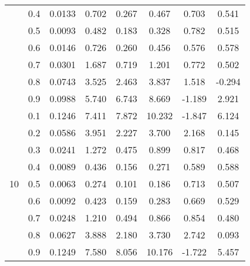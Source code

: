 \documentclass[11pt,a4paper]{report}
\begin{document}
\begin{longtable}{ | c | c || c | c | c | c | c | c | }
 & 0.4 & 0.0133 & 0.702 & 0.267 & 0.467 & 0.703 & 0.541 \\
 & 0.5 & 0.0093 & 0.482 & 0.183 & 0.328 & 0.782 & 0.515 \\
 & 0.6 & 0.0146 & 0.726 & 0.260 & 0.456 & 0.576 & 0.578 \\
 & 0.7 & 0.0301 & 1.687 & 0.719 & 1.201 & 0.772 & 0.502 \\
 & 0.8 & 0.0743 & 3.525 & 2.463 & 3.837 & 1.518 & -0.294 \\
 & 0.9 & 0.0988 & 5.740 & 6.743 & 8.669 & -1.189 & 2.921 \\
 \hline
\multirow{9}{*}{10} & 0.1 & 0.1246 & 7.411 & 7.872 & 10.232 & -1.847 & 6.124 \\
 & 0.2 & 0.0586 & 3.951 & 2.227 & 3.700 & 2.168 & 0.145 \\
 & 0.3 & 0.0241 & 1.272 & 0.475 & 0.899 & 0.817 & 0.468 \\
 & 0.4 & 0.0089 & 0.436 & 0.156 & 0.271 & 0.589 & 0.588 \\
 & 0.5 & 0.0063 & 0.274 & 0.101 & 0.186 & 0.713 & 0.507 \\
 & 0.6 & 0.0092 & 0.423 & 0.159 & 0.283 & 0.669 & 0.529 \\
 & 0.7 & 0.0248 & 1.210 & 0.494 & 0.866 & 0.854 & 0.480 \\
 & 0.8 & 0.0627 & 3.888 & 2.180 & 3.730 & 2.742 & 0.093 \\
 & 0.9 & 0.1249 & 7.580 & 8.056 & 10.176 & -1.722 & 5.457 \\
 \hline
\hline
\end{longtable}
\end{document}
